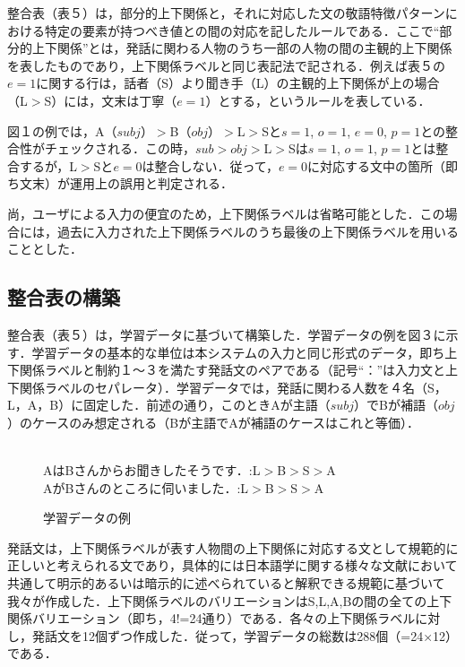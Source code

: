 整合表（表５）は，部分的上下関係と，それに対応した文の敬語特徴パターンにおける特定の要素が持つべき値との間の対応を記したルールである．ここで``部分的上下関係''とは，発話に関わる人物のうち一部の人物の間の主観的上下関係を表したものであり，上下関係ラベルと同じ表記法で記される．例えば表５の$e=1$に関する行は，話者（S）より聞き手（L）の主観的上下関係が上の場合（L$>$S）には，文末は丁寧（$e=1$）とする，というルールを表している．

図１の例では，A（$subj$）$>$B（$obj$）$>$L$>$Sと$s=1$, $o=1$, $e=0$, $p=1$との整合性がチェックされる．この時，$sub>obj>$L$>$Sは$s=1$, $o=1$, $p=1$とは整合するが，L$>$Sと$e=0$は整合しない．従って，$e=0$に対応する文中の箇所（即ち文末）が運用上の誤用と判定される．

尚，ユーザによる入力の便宜のため，上下関係ラベルは省略可能とした．この場合には，過去に入力された上下関係ラベルのうち最後の上下関係ラベルを用いることとした．

\subsection{整合表の構築}
整合表（表５）は，学習データに基づいて構築した．学習データの例を図３に示す．学習データの基本的な単位は本システムの入力と同じ形式のデータ，即ち上下関係ラベルと制約１〜３を満たす発話文のペアである（記号``：''は入力文と上下関係ラベルのセパレータ）．学習データでは，発話に関わる人数を４名（S，L，A，B）に固定した．前述の通り，このときAが主語（$subj$）でBが補語（$obj$）のケースのみ想定される（Bが主語でAが補語のケースはこれと等価）．

\begin{figure}[htbp]
\begin{center}
\fbox
{
\begin{minipage}{80mm}
\baselineskip=4mm
　\\
AはBさんからお聞きしたそうです．:L$>$B$>$S$>$A\\
AがBさんのところに伺いました．:L$>$B$>$S$>$A\\
\end{minipage}
}
\caption{学習データの例}
\label{fig:figure3}
\end{center}
\end{figure}

発話文は，上下関係ラベルが表す人物間の上下関係に対応する文として規範的に正しいと考えられる文であり，具体的には日本語学に関する様々な文献\cite[等]{Ishino1986,Kabaya1998,Kikuchi1996,Kikuchi1997,Kokugoken1990,Kokugoken1992,Suzuki1984,Hoshino1993,Horikawa1969,Masuoka1989,Miyaji1999,Moriyama2000}において共通して明示的あるいは暗示的に述べられていると解釈できる規範に基づいて我々が作成した．上下関係ラベルのバリエーションはS,L,A,Bの間の全ての上下関係バリエーション（即ち，4!=24通り）である．各々の上下関係ラベルに対し，発話文を12個ずつ作成した．従って，学習データの総数は288個（=24×12）である．


